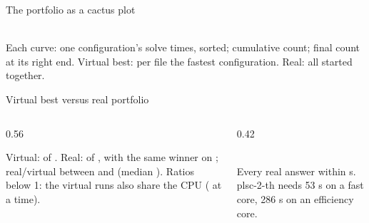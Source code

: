 \documentclass[aspectratio=169]{beamer}
\begin{document}
\begin{frame}{The portfolio as a cactus plot}
  \centering
  \begin{tikzpicture}
    
  \end{tikzpicture}\\
  \footnotesize Each curve: one configuration's solve times, sorted; cumulative count; final count at
  its right end. Virtual best: per file the fastest configuration. Real: all \pfNumConfigs{}
  started together.
\end{frame}

\begin{frame}{Virtual best versus real portfolio}
  \begin{columns}[T]
  \begin{column}{0.56\textwidth}
    \tiny\setlength{\tabcolsep}{3pt}
    
    \medskip

    \scriptsize Virtual: \pfVirtual{} of \pfTotal{}. Real: \pfReal{} of \pfTotal{}, with the same winner on
    \pfSame{}; real/virtual between \pfRatioMin{} and \pfRatioMax{} (median \pfRatioMed). Ratios
    below 1: the virtual runs also share the CPU (\pfJobs{} at a time).
  \end{column}
  \begin{column}{0.42\textwidth}
    \centering
    \begin{tikzpicture}
      
    \end{tikzpicture}\\
    \scriptsize Every real answer within \pfMaxReal{} s. plsc-2-th needs 53 s on a fast
    core, 286 s on an efficiency core.
  \end{column}
  \end{columns}
\end{frame}
\end{document}
